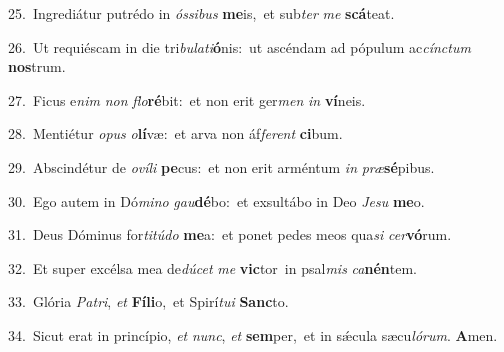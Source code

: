 {\numbfont\textcolor{\numbcolor}{25.}}~Ingrediátur putrédo in \textit{ós}\-\textit{si}\textit{bus} \textbf{me}\-is,~\star et sub\textit{ter} \textit{me} \textbf{scá}\-teat.\par
{\numbfont\textcolor{\numbcolor}{26.}}~Ut requiéscam in die tri\-\textit{bu}\-\textit{la}\textit{ti}\textbf{ó}nis:~\star ut ascéndam ad pópulum ac\-\textit{cínc}\-\textit{tum} \textbf{nos}\-trum.\par
{\numbfont\textcolor{\numbcolor}{27.}}~Ficus e\textit{nim} \textit{non} \textit{flo}\-\textbf{ré}bit:~\star et non erit ger\textit{men} \textit{in} \textbf{ví}\-neis.\par
{\numbfont\textcolor{\numbcolor}{28.}}~Mentiétur \textit{o}\-\textit{pus} \textit{o}\-\textbf{lí}væ:~\star et arva non áf\-\textit{fe}\-\textit{rent} \textbf{ci}\-bum.\par
{\numbfont\textcolor{\numbcolor}{29.}}~Abscindétur de \textit{o}\-\textit{ví}\textit{li} \textbf{pe}\-cus:~\star et non erit arméntum \textit{in} \textit{præ}\-\textbf{sé}pibus.\par
{\numbfont\textcolor{\numbcolor}{30.}}~Ego autem in Dó\-\textit{mi}\-\textit{no} \textit{gau}\-\textbf{dé}bo:~\star et exsultábo in Deo \textit{Je}\-\textit{su} \textbf{me}\-o.\par
{\numbfont\textcolor{\numbcolor}{31.}}~Deus Dóminus for\-\textit{ti}\-\textit{tú}\textit{do} \textbf{me}\-a:~\star et ponet pedes meos qua\textit{si} \textit{cer}\-\textbf{vó}rum.\par
{\numbfont\textcolor{\numbcolor}{32.}}~Et super excélsa mea de\-\textit{dú}\-\textit{cet} \textit{me} \textbf{vic}\-tor~\star in psal\textit{mis} \textit{ca}\-\textbf{nén}tem.\par
{\numbfont\textcolor{\numbcolor}{33.}}~Glória \textit{Pa}\-\textit{tri}, \textit{et} \textbf{Fí}\-\textbf{li}o,~\star et Spirí\-\textit{tu}\-\textit{i} \textbf{Sanc}\-to.\par
{\numbfont\textcolor{\numbcolor}{34.}}~Sicut erat in princípio, \textit{et} \textit{nunc}\-, \textit{et} \textbf{sem}\-per,~\star et in sǽcula sæcu\-\textit{ló}\-\textit{rum}. \textbf{A}\-men.\par
